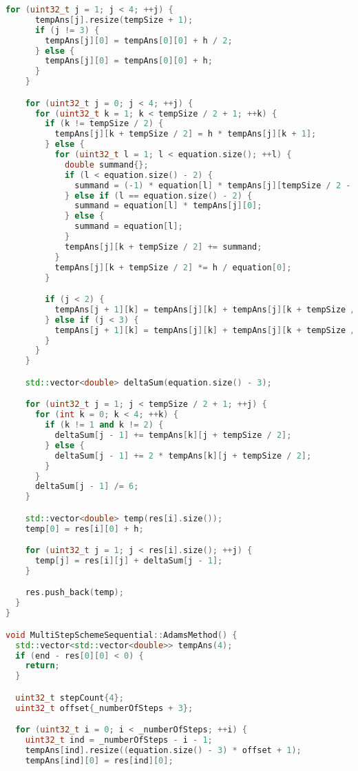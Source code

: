 \documentclass{report}
\begin{document}
\begin{lstlisting}[language=C++,caption=Последовательная версия]
    for (uint32_t j = 1; j < 4; ++j) {
      tempAns[j].resize(tempSize + 1);
      if (j != 3) {
        tempAns[j][0] = tempAns[0][0] + h / 2;
      } else {
        tempAns[j][0] = tempAns[0][0] + h;
      }
    }

    for (uint32_t j = 0; j < 4; ++j) {
      for (uint32_t k = 1; k < tempSize / 2 + 1; ++k) {
        if (k != tempSize / 2) {
          tempAns[j][k + tempSize / 2] = h * tempAns[j][k + 1];
        } else {
          for (uint32_t l = 1; l < equation.size(); ++l) {
            double summand{};
            if (l < equation.size() - 2) {
              summand = (-1) * equation[l] * tempAns[j][tempSize / 2 - l + 1];
            } else if (l == equation.size() - 2) {
              summand = equation[l] * tempAns[j][0];
            } else {
              summand = equation[l];
            }
            tempAns[j][k + tempSize / 2] += summand;
          }
          tempAns[j][k + tempSize / 2] *= h / equation[0];
        }

        if (j < 2) {
          tempAns[j + 1][k] = tempAns[j][k] + tempAns[j][k + tempSize / 2] / 2;
        } else if (j < 3) {
          tempAns[j + 1][k] = tempAns[j][k] + tempAns[j][k + tempSize / 2];
        }
      }
    }

    std::vector<double> deltaSum(equation.size() - 3);

    for (uint32_t j = 1; j < tempSize / 2 + 1; ++j) {
      for (int k = 0; k < 4; ++k) {
        if (k != 1 and k != 2) {
          deltaSum[j - 1] += tempAns[k][j + tempSize / 2];
        } else {
          deltaSum[j - 1] += 2 * tempAns[k][j + tempSize / 2];
        }
      }
      deltaSum[j - 1] /= 6;
    }

    std::vector<double> temp(res[i].size());
    temp[0] = res[i][0] + h;

    for (uint32_t j = 1; j < res[i].size(); ++j) {
      temp[j] = res[i][j] + deltaSum[j - 1];
    }

    res.push_back(temp);
  }
}

void MultiStepSchemeSequential::AdamsMethod() {
  std::vector<std::vector<double>> tempAns(4);
  if (end - res[0][0] < 0) {
    return;
  }

  uint32_t stepCount{4};
  uint32_t offset{_numberOfSteps + 3};

  for (uint32_t i = 0; i < _numberOfSteps; ++i) {
    uint32_t ind = _numberOfSteps - i - 1;
    tempAns[ind].resize((equation.size() - 3) * offset + 1);
    tempAns[ind][0] = res[ind][0];


\end{lstlisting}
\end{document}
